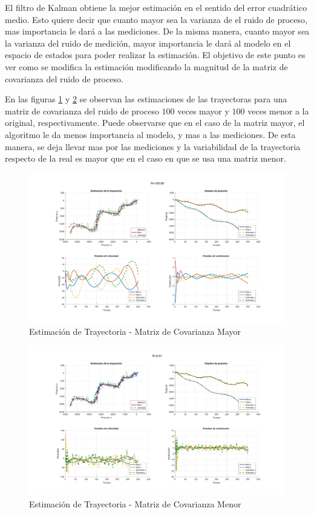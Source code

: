 
	El filtro de Kalman obtiene la mejor estimación en el sentido del error cuadrático medio. Esto quiere decir que cuanto mayor sea la varianza de el ruido de proceso, mas importancia le dará a las mediciones. De la misma manera, cuanto mayor sea la varianza del ruido de medición, mayor importancia le dará al modelo en el espacio de estados para poder realizar la estimación. El objetivo de este punto es ver como se modifica la estimación modificando la magnitud de la matriz de covarianza del ruido de proceso.
	
	En las figuras \ref{fig:ej5r1} y \ref{fig:ej5r2} se observan las estimaciones de las trayectoras para una matriz de covarianza del ruido de proceso $100$ veces mayor y $100$ veces menor a la original, respectivamente. Puede observarse que en el caso de la matriz mayor, el algoritmo le da menos importancia al modelo, y mas a las mediciones. De esta manera, se deja llevar mas por las mediciones y la variabilidad de la trayectoria respecto de la real es mayor que en el caso en que se usa una matriz menor.
	
	\begin{figure}[H]
		\centering
		\includegraphics[width=1.0\textwidth,keepaspectratio]{Figuras/graf_ej6_R1.pdf}
		\caption{Estimación de Trayectoria - Matriz de Covarianza Mayor}
		\label{fig:ej5r1}
	\end{figure}
	
	\begin{figure}[H]
		\centering
		\includegraphics[width=1.0\textwidth,keepaspectratio]{Figuras/graf_ej6_R2.pdf}
		\caption{Estimación de Trayectoria - Matriz de Covarianza Menor}
		\label{fig:ej5r2}
	\end{figure}
	
